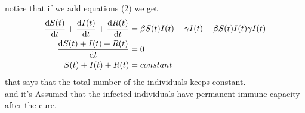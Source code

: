 \documentclass[]{article}
\begin{document}
notice that if we add equations (2) we get 
\begin{align*}
        \dv{S(t)}{t} + \dv{I(t)}{t} + \dv{R(t)}{t} &= \beta S(t)I(t)-\gamma I(t) -\beta S(t)I(t) \gamma I(t) 
        \\
        \dv{S(t) + I(t) + R(t)}{t} &= 0
        \\
        S(t) + I(t) + R(t) &= constant
\end{align*}
that says that the total number of the individuals keeps constant. 
\\
and it's Assumed that the infected individuals have permanent immune capacity after the cure.

\end{document}
